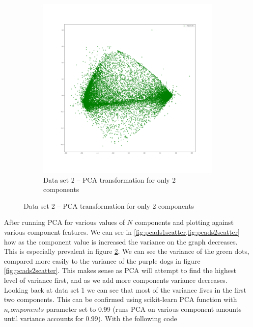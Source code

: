 \documentclass[
letterpaper, %
]{IEEEtran}
\begin{document}
	\begin{figure}[ht]\ContinuedFloat
		\begin{subfigure}{.5\textwidth}
			\centering
			\includegraphics[width=\linewidth]{./images/ds2/pca/scatter/2components.png}
			\caption{Data set 2 -- PCA transformation for only 2 components}
			\label{fig:pcads2comp2}
		\end{subfigure}
	\end{figure}

	After running PCA for various values of $N$ components and plotting against various component features. We can see in \cref{fig:pcads1scatter,fig:pcads2scatter} how as the component value is increased the variance on the graph decreases. This is especially prevalent in figure \ref{fig:pcads2comp2}. We can see the variance of the green dots, compared more easily to the variance of the purple dogs in figure \ref{fig:pcads2scatter}. This makes sense as PCA will attempt to find the highest level of variance first, and as we add more components variance decreases. Looking back at data set 1 we can see that most of the variance lives in the first two components. This can be confirmed using scikit-learn PCA function with $n_components$ parameter set to 0.99 (runs PCA on various component amounts until variance accounts for 0.99). With the following code 
	
\end{document}
